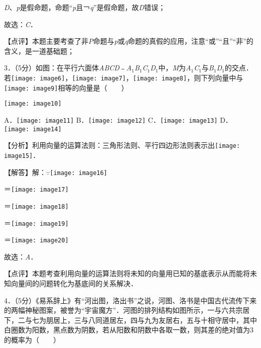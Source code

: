 \documentclass[a4paper,11pt,UTF8,twoside]{ctexart} %
\begin{document}
\textit{D}、\textit{p}是假命题，命题``\textit{p}且￢\textit{q}''是假命题，故\textit{D}错误；

故选：\textit{C}．

【点评】本题主要考查了非\textit{P}命题与\textit{p}或\textit{q}命题的真假的应用，注意``或''``且''``非''的含义，是一道基础题；

3．（5分）如图：在平行六面体\textit{ABCD}﹣\textit{A}${}_{1}$\textit{B}${}_{1}$\textit{C}${}_{1}$\textit{D}${}_{1}$中，\textit{M}为\textit{A}${}_{1}$\textit{C}${}_{1}$与\textit{B}${}_{1}$\textit{D}${}_{1}$的交点．若\texttt{[image: image6]}，\texttt{[image: image7]}，\texttt{[image: image8]}，则下列向量中与\texttt{[image: image9]}相等的向量是（　　）

\texttt{[image: image10]}

A．\texttt{[image: image11]} B．\texttt{[image: image12]} C．\texttt{[image: image13]} D．\texttt{[image: image14]}

【分析】利用向量的运算法则：三角形法则、平行四边形法则表示出\texttt{[image: image15]}．

【解答】解：$\mathrm{\because}$\texttt{[image: image16]}

＝\texttt{[image: image17]}

＝\texttt{[image: image18]}

＝\texttt{[image: image19]}

＝\texttt{[image: image20]}

故选：\textit{A}．

【点评】本题考查利用向量的运算法则将未知的向量用已知的基底表示从而能将未知向量间的问题转化为基底间的关系解决．

4．（5分）《易系辞上》有``河出图，洛出书''之说，河图、洛书是中国古代流传下来的两幅神秘图案，被誉为``宇宙魔方''．河图的排列结构如图所示，一与六共宗居下，二与七为朋居上，三与八同道居左，四与九为友居右，五与十相守居中，其中白圈数为阳数，黑点数为阴数，若从阳数和阴数中各取一数，则其差的绝对值为3的概率为（　　）
\end{document}
